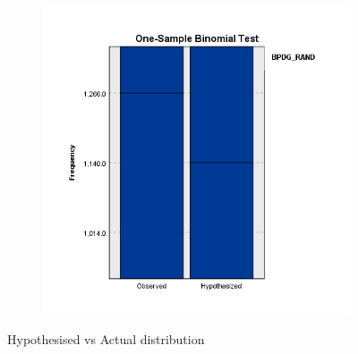 \documentclass{UoYCSproject}
\begin{document}
\begin{figure}[htb]
\begin{subfigure}[b]{0.45\textwidth}
    \end{subfigure}
    ~
    \begin{subfigure}[b]{0.45\textwidth}
      \centering
      \includegraphics[width=\textwidth]{ExternalValidation/bpdg_rand.png}
    \end{subfigure}
    \caption{Hypothesised vs Actual distribution}
    \label{fig:hypothesised_vs_actual}
  \end{figure}
\end{document}
